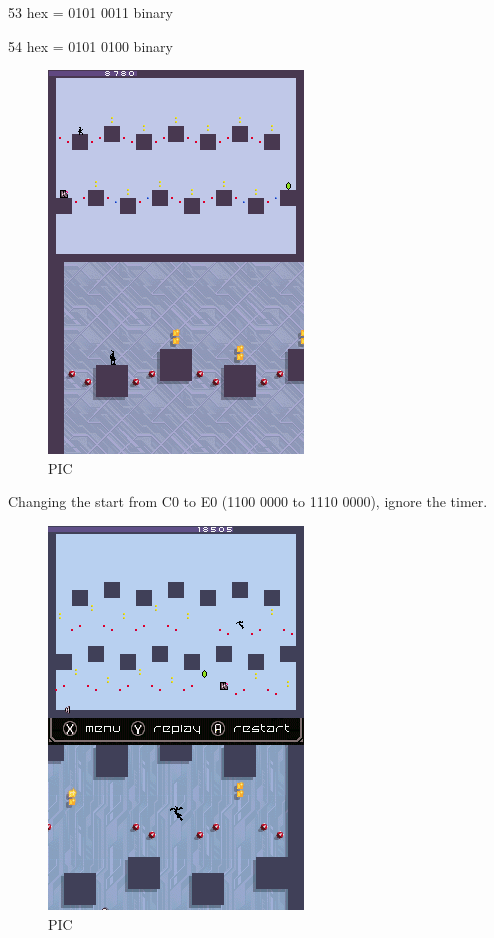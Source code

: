 \documentclass[
]{book}
\begin{document}
53 hex = 0101 0011 binary

54 hex = 0101 0100 binary

\begin{figure}
\centering
\includegraphics{images/181_home_fast6191_romhackingguide_unrenamed_fil___rs_romhackingguideleveleditingworkedNplus14.png}
\caption{PIC}
\end{figure}

Changing the start from C0 to E0 (1100 0000 to 1110 0000), ignore the timer.

\begin{figure}
\centering
\includegraphics{images/182_home_fast6191_romhackingguide_unrenamed_fil___rs_romhackingguideleveleditingworkedNplus15.png}
\caption{PIC}
\end{figure}
\end{document}
